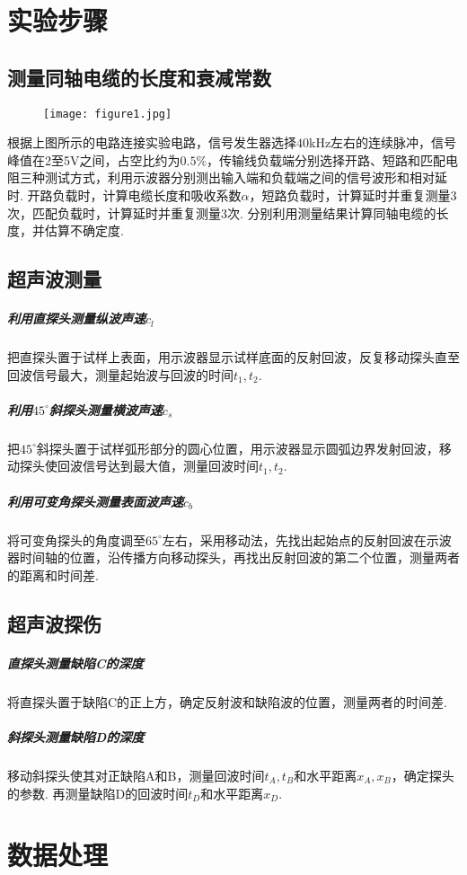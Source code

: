 \documentclass{thureport}
\begin{document}
\section{实验步骤}
\subsection{测量同轴电缆的长度和衰减常数}
\begin{figure}[H]
	\centering
	\texttt{[image: figure1.jpg]}
\end{figure}

根据上图所示的电路连接实验电路，信号发生器选择$40$kHz左右的连续脉冲，信号峰值在2至5V之间，占空比约为$0.5\%$，传输线负载端分别选择开路、短路和匹配电阻三种测试方式，利用示波器分别测出输入端和负载端之间的信号波形和相对延时. 开路负载时，计算电缆长度和吸收系数$\alpha$，短路负载时，计算延时并重复测量3次，匹配负载时，计算延时并重复测量3次. 分别利用测量结果计算同轴电缆的长度，并估算不确定度.

\subsection{超声波测量}
\subparagraph{利用直探头测量纵波声速$c_l$}
把直探头置于试样上表面，用示波器显示试样底面的反射回波，反复移动探头直至回波信号最大，测量起始波与回波的时间$t_1,t_2$.

\subparagraph{利用$45^\circ$斜探头测量横波声速$c_s$}
把$45^\circ$斜探头置于试样弧形部分的圆心位置，用示波器显示圆弧边界发射回波，移动探头使回波信号达到最大值，测量回波时间$t_1,t_2$.

\subparagraph{利用可变角探头测量表面波声速$c_b$}
将可变角探头的角度调至$65^\circ$左右，采用移动法，先找出起始点的反射回波在示波器时间轴的位置，沿传播方向移动探头，再找出反射回波的第二个位置，测量两者的距离和时间差.

\subsection{超声波探伤}
\subparagraph{直探头测量缺陷C的深度}
将直探头置于缺陷C的正上方，确定反射波和缺陷波的位置，测量两者的时间差.

\subparagraph{斜探头测量缺陷D的深度}
移动斜探头使其对正缺陷A和B，测量回波时间$t_A,t_B$和水平距离$x_A,x_B$，确定探头的参数. 再测量缺陷D的回波时间$t_D$和水平距离$x_D$.

\section{数据处理}
\end{document}
